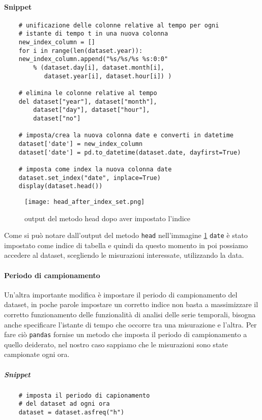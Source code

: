 \paragraph{Snippet}
\begin{verbatim}
    # unificazione delle colonne relative al tempo per ogni 
    # istante di tempo t in una nuova colonna
    new_index_column = []
    for i in range(len(dataset.year)):
    new_index_column.append("%s/%s/%s %s:0:0" 
        % (dataset.day[i], dataset.month[i], 
           dataset.year[i], dataset.hour[i]) )

    # elimina le colonne relative al tempo
    del dataset["year"], dataset["month"], 
        dataset["day"], dataset["hour"], 
        dataset["no"]

    # imposta/crea la nuova colonna date e converti in datetime
    dataset['date'] = new_index_column
    dataset['date'] = pd.to_datetime(dataset.date, dayfirst=True)

    # imposta come index la nuova colonna date
    dataset.set_index("date", inplace=True)
    display(dataset.head())
\end{verbatim}
\begin{figure}[h!]
    \texttt{[image: head\_after\_index\_set.png]}
    \caption{output del metodo head dopo aver impostato l'indice}
    \label{fig:head_after_index_set}
\end{figure}
Come si può notare dall'output del metodo \texttt{head} nell'immagine \ref*{fig:head_after_index_set}
\texttt{date} è stato impostato come indice di tabella e quindi da questo momento in poi
possiamo accedere al dataset, scegliendo le misurazioni interessate, utilizzando la
data.

\paragraph{Periodo di campionamento}
Un'altra importante modifica è impostare il periodo di campionamento del dataset,
in poche parole impostare un corretto indice non basta a massimizzare il corretto
funzionamento delle funzionalità di analisi delle serie temporali, bisogna anche specificare
l'istante di tempo che occorre tra una misurazione e l'altra. Per fare ciò
\texttt{pandas} fornise un metodo che imposta il periodo di campionamento
a quello deiderato, nel nostro caso sappiamo che le misurazioni sono state campionate
ogni ora.
\subparagraph{Snippet}
\begin{verbatim}
    # imposta il periodo di capionamento 
    # del dataset ad ogni ora
    dataset = dataset.asfreq("h")
\end{verbatim}

